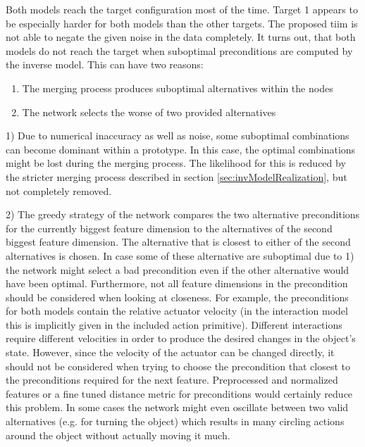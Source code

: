 Both models reach the target configuration most of the time. Target 1 appears to be especially harder for both models than the other targets. The proposed \gls{tiim} is not able to negate the given noise in the data completely. It turns out, that both models do not reach the target when suboptimal preconditions are computed by the inverse model. This can have two reasons:
\begin{enumerate}
\item The merging process produces suboptimal alternatives within the nodes
\item The network selects the worse of two provided alternatives
\end{enumerate}

1) Due to numerical inaccuracy as well as noise, some suboptimal combinations can become dominant within a prototype. In this case, the optimal combinations might be lost during the merging process. The likelihood for this is reduced by the stricter merging process described in section \ref{sec:invModelRealization}, but not completely removed.

2) The greedy strategy of the network compares the two alternative preconditions for the currently biggest feature dimension to the alternatives of the second biggest feature dimension. The alternative that is closest to either of the second alternatives is chosen. In case some of these alternative are suboptimal due to 1) the network might select a bad precondition even if the other alternative would have been optimal. Furthermore, not all feature dimensions in the precondition should be considered when looking at closeness. For example, the preconditions for both models contain the relative actuator velocity (in the interaction model this is implicitly given in the included action primitive). Different interactions require different velocities in order to produce the desired changes in the object's state. However, since the velocity of the actuator can be changed directly, it should not be considered when trying to choose the precondition that closest to the preconditions required for the next feature. Preprocessed and normalized features or a fine tuned distance metric for preconditions would certainly reduce this problem.
In some cases the network might even oscillate between two valid alternatives (e.g. for turning the object) which results in many circling actions around the object without actually moving it much.

